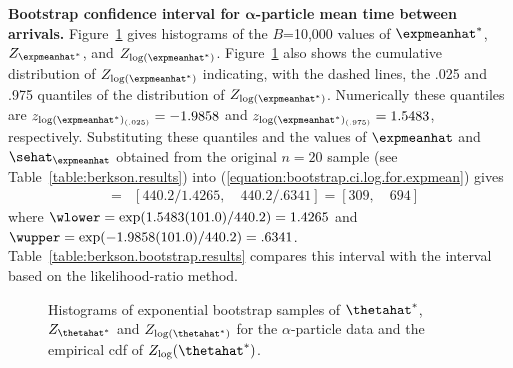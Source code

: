 \begin{example}
{\bf Bootstrap confidence interval for
$\boldsymbol{\alpha}$-particle mean time between arrivals.}
Figure~\ref{figure:alpha.boot.summary.ps} gives histograms of the
$B$=10,000 values of $\expmeanhat^{*}$, $Z_{\expmeanhat^{*}}$, and
$Z_{\log(\expmeanhat^{*})}$.
Figure~\ref{figure:alpha.boot.summary.ps} also shows the cumulative
distribution of $Z_{\log(\expmeanhat^{*})}$ indicating, with the
dashed lines, the .025 and .975 quantiles of the distribution of
$Z_{\log(\expmeanhat^{*})}$. Numerically these quantiles are
$z_{\log(\expmeanhat^{*})_{(.025)}} = -1.9858$ and
$z_{\log(\expmeanhat^{*})_{(.975)}}=1.5483$, respectively.
Substituting these quantiles and the values of $\expmeanhat$ and
$\sehat_{\expmeanhat}$ obtained from the original
$n=20$ sample (see Table~\ref{table:berkson.results}) into
(\ref{equation:bootstrap.ci.log.for.expmean}) gives
\begin{eqnarray*}
[ \undertilde{\expmean}, \quad \tilde{\expmean}] &=&
[440.2/1.4265, \quad
440.2/.6341]= [ 309    , \quad  694 ]
\end{eqnarray*}
where $\wlower=\exp( 1.5483 (101.0)/440.2) = 1.4265$ and
$\wupper=\exp( -1.9858 (101.0)/440.2) = .6341$.
Table~\ref{table:berkson.bootstrap.results} compares this interval
with the interval based on the likelihood-ratio method.
\begin{figure}
\caption{Histograms of exponential
bootstrap samples of $\thetahat^{*}$,
$Z_{\thetahat^{*}}$ and $Z_{\log(\thetahat^{*})}$ for the $\alpha$-particle
data and the empirical cdf of $Z_{\log}(\thetahat^{*})$.}
\label{figure:alpha.boot.summary.ps}
\end{figure}
\end{example}

